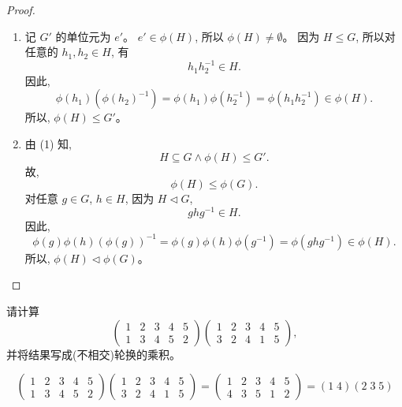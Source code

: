 \documentclass[a4paper, justified]{tufte-handout}
\begin{document}
\begin{proof}
  \begin{enumerate}[(1)]
    \item 记 $G'$ 的单位元为 $e'$。
      $e' \in \phi(H)$, 所以 $\phi(H) \neq \emptyset$。
      因为 $H \le G$,
      所以对任意的 $h_{1}, h_{2} \in H$, 有
      \[
        h_{1}h_{2}^{-1} \in H.
      \]
      因此,
      \[
        \phi(h_{1})(\phi(h_{2})^{-1}) = \phi(h_{1})\phi(h_{2}^{-1})
          = \phi(h_{1}h_{2}^{-1}) \in \phi(H).
      \]
      所以, $\phi(H) \le G'$。
    \item 由 (1) 知,
      \[
        H \subseteq G \land \phi(H) \le G'.
      \]
      故,
      \[
        \phi(H) \le \phi(G).
      \]
      对任意 $g \in G$, $h \in H$, 因为 $H \triangleleft G$,
      \[
        ghg^{-1} \in H.
      \]
      因此,
      \[
        \phi(g)\phi(h)(\phi(g))^{-1} = \phi(g)\phi(h)\phi(g^{-1})
          = \phi(ghg^{-1}) \in \phi(H).
      \]
      所以, $\phi(H) \triangleleft \phi(G)$。
  \end{enumerate}
\end{proof}

\begin{problem}
  请计算
  \[
    \begin{pmatrix}
      1 & 2 & 3 & 4 & 5 \\
      1 & 3 & 4 & 5 & 2
    \end{pmatrix}
    \begin{pmatrix}
      1 & 2 & 3 & 4 & 5 \\
      3 & 2 & 4 & 1 & 5
    \end{pmatrix},
  \]
  并将结果写成(不相交)轮换的乘积。
\end{problem}

\begin{solution}
  \[
    \begin{pmatrix}
      1 & 2 & 3 & 4 & 5 \\
      1 & 3 & 4 & 5 & 2
    \end{pmatrix}
    \begin{pmatrix}
      1 & 2 & 3 & 4 & 5 \\
      3 & 2 & 4 & 1 & 5
    \end{pmatrix} =
    \begin{pmatrix}
      1 & 2 & 3 & 4 & 5 \\
      4 & 3 & 5 & 1 & 2
    \end{pmatrix}
    = (1\; 4) (2\; 3\; 5)
  \]
\end{solution}
\end{document}
